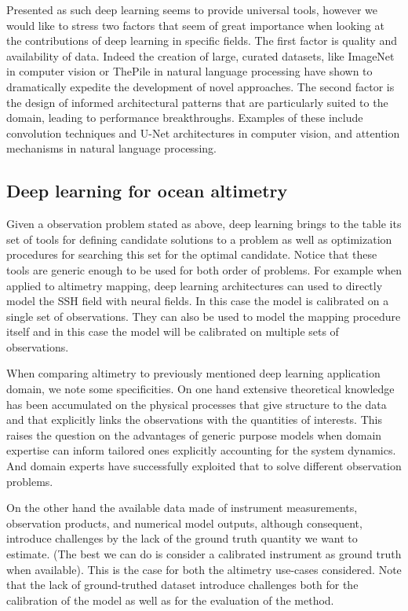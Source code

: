 \begin{bibunit}
Presented as such deep learning seems to provide universal tools,  
however we would like to stress two factors that seem of great importance when looking at the contributions of deep learning in specific fields.
The first factor is quality and availability of data.
Indeed the creation of large, curated datasets, like ImageNet\cite{} in computer vision or ThePile\cite{} in natural language processing have shown to dramatically expedite the development of novel approaches. 
The second factor is the design of informed architectural patterns that are particularly suited to the domain, leading to performance breakthroughs.
Examples of these include convolution techniques\cite{} and U-Net architectures\cite{} in computer vision, and attention mechanisms\cite{} in natural language processing.


\subsection{Deep learning for ocean altimetry}
Given a observation problem stated as above, deep learning brings to the table its set of tools for defining candidate solutions to a problem as well as optimization procedures for searching this set for the optimal candidate.
Notice that these tools are generic enough to be used for both order of problems. For example when applied to altimetry mapping, deep learning architectures can used to directly model the SSH field with neural fields\cite{}. In this case the model is calibrated on a single set of observations.
They can also be used to model the mapping procedure itself\cite{} and in this case the model will be calibrated on multiple sets of observations.

When comparing altimetry to previously mentioned deep learning application domain, we note some specificities.
On one hand extensive theoretical knowledge has been accumulated on the physical processes that give structure to the data and that explicitly links the observations with the quantities of interests.
This raises the question on the advantages of generic purpose models when domain expertise can inform tailored ones explicitly accounting for the system dynamics.
And domain experts have successfully exploited that to solve different observation problems.

On the other hand the available data made of instrument measurements, observation products, and numerical model outputs, although consequent, introduce challenges by the lack of the ground truth quantity we want to estimate. (The best we can do is consider a calibrated instrument as ground truth when available). This is the case for both the altimetry use-cases considered.
Note that the lack of ground-truthed dataset introduce challenges both for the calibration of the model as well as for the evaluation of the method.



\end{bibunit}
